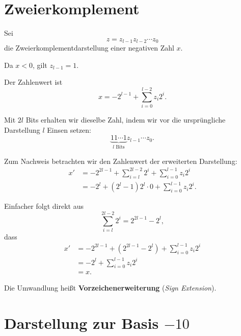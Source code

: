 \documentclass{report}
\begin{document}
\section{Zweierkomplement}


\begin{myproof}
  Sei
  \[
    z=z_{l-1}z_{l-2}\cdots z_0
  \]
  die Zweierkomplementdarstellung einer negativen
  Zahl $x$.

  Da $x<0$, gilt $z_{l-1}=1$.

  Der Zahlenwert ist
  \[
    x=-2^{l-1}
      +\sum_{i=0}^{l-2}z_i2^i.
  \]

  Mit $2l$ Bits erhalten wir dieselbe Zahl,
  indem wir vor die ursprüngliche Darstellung
  $l$ Einsen setzen:
  \[
    \boxed{
      \underbrace{11\cdots1}_{l\text{ Bits}}
      z_{l-1}\cdots z_0.
    }
  \]

  Zum Nachweis betrachten wir den Zahlenwert
  der erweiterten Darstellung:
  \begin{align*}
    x'
    &=-2^{2l-1}
      +\sum_{i=l}^{2l-2}2^i
      +\sum_{i=0}^{l-1}z_i2^i\\
    &=-2^l+(2^l-1)2^l
      \cdot 0
      +\sum_{i=0}^{l-1}z_i2^i.
  \end{align*}

  Einfacher folgt direkt aus
  \[
    \sum_{i=l}^{2l-2}2^i=2^{2l-1}-2^l,
  \]
  dass
  \begin{align*}
    x'
    &=-2^{2l-1}
      +(2^{2l-1}-2^l)
      +\sum_{i=0}^{l-1}z_i2^i\\
    &=-2^l+\sum_{i=0}^{l-1}z_i2^i\\
    &=x.
  \end{align*}

  Die Umwandlung heißt \textbf{Vorzeichenerweiterung}
  (\textit{Sign Extension}).
\end{myproof}


\section{Darstellung zur Basis $-10$}

\end{document}
